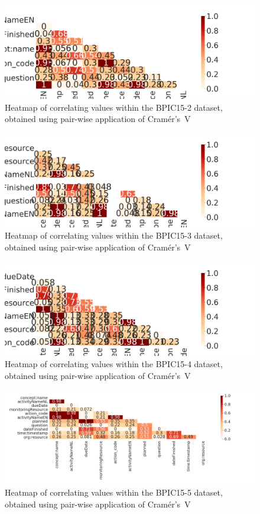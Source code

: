 \begin{figure}[ht!]
\centering
\includegraphics[width=\textwidth]{gfx/bpic2015_2/correlation-heatmap.png}
\caption{Heatmap of correlating values within the BPIC15-2 dataset, obtained using pair-wise application of Cramér's~V}
\label{fig:BPIC15-2-correlation-heatmap}
\end{figure}

\begin{figure}[ht!]
\centering
\includegraphics[width=\textwidth]{gfx/bpic2015_3/correlation-heatmap.png}
\caption{Heatmap of correlating values within the BPIC15-3 dataset, obtained using pair-wise application of Cramér's~V}
\label{fig:BPIC15-3-correlation-heatmap}
\end{figure}

\begin{figure}[ht!]
\centering
\includegraphics[width=\textwidth]{gfx/bpic2015_4/correlation-heatmap.png}
\caption{Heatmap of correlating values within the BPIC15-4 dataset, obtained using pair-wise application of Cramér's~V}
\label{fig:BPIC15-4-correlation-heatmap}
\end{figure}

\begin{figure}[ht!]
\centering
\includegraphics[width=\textwidth]{gfx/bpic2015_5/correlation-heatmap.png}
\caption{Heatmap of correlating values within the BPIC15-5 dataset, obtained using pair-wise application of Cramér's~V}
\label{fig:BPIC15-5-correlation-heatmap}
\end{figure}
